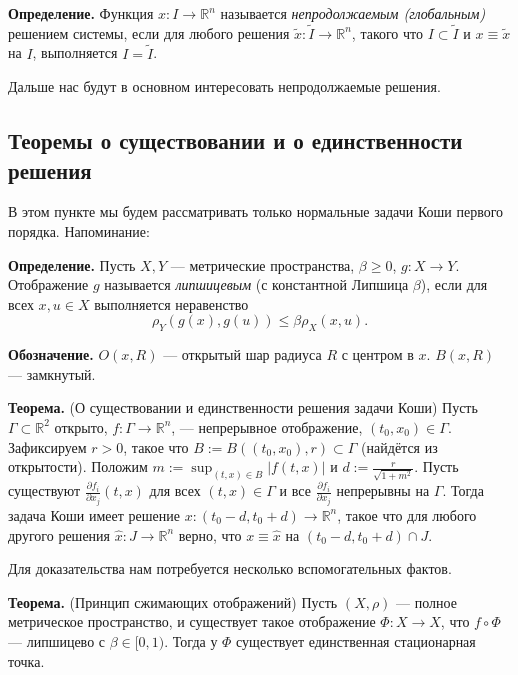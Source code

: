 \textbf{Определение.} Функция $x: I \to \mathbb R^n$ называется \textit{непродолжаемым (глобальным)} решением системы, если для любого решения $\tilde{x}: \tilde{I} \to \mathbb R^n$, такого что $I \subset \tilde{I}$ и $x \equiv \tilde{x}$ на $I$, выполняется $I = \tilde{I}$.

Дальше нас будут в основном интересовать непродолжаемые решения.

\subsection{Теоремы о существовании и о единственности решения}
В этом пункте мы будем рассматривать только нормальные задачи Коши первого порядка. Напоминание:

\textbf{Определение.} Пусть $X, Y$ --- метрические пространства, $\beta \ge 0$, $g: X \to Y$. Отображение $g$ называется \textit{липшицевым} (с константной Липшица $\beta$), если для всех $x, u \in X$ выполняется неравенство
\[
    \rho_Y(g(x), g(u)) \le \beta \rho_X(x, u).
\]

\textbf{Обозначение.} $O(x, R)$ --- открытый шар радиуса $R$ с центром в $x$. $B(x, R)$ --- замкнутый.

\textbf{Теорема.} (О существовании и единственности решения задачи Коши)
Пусть $\Gamma \subset \mathbb R^2$ открыто, $f: \Gamma \to \mathbb R^n$, --- непрерывное отображение, $(t_0, x_0) \in \Gamma$.
Зафиксируем $r > 0$, такое что $B := B((t_0, x_0), r) \subset \Gamma$ (найдётся из открытости).
Положим $m := \sup_{(t, x) \in B} |f(t, x)|$ и $d := \frac{r}{\sqrt {1 + m^2}}$.
Пусть существуют $\frac{\partial f_i}{\partial x_j}(t, x)$ для всех $(t, x) \in \Gamma$ и все $\frac{\partial f_i}{\partial x_j}$ непрерывны на $\Gamma$.
Тогда задача Коши имеет решение $x: (t_0 - d, t_0 + d) \to \mathbb R^n$, такое что для любого другого решения $\widehat{x}: J \to \mathbb R^n$ верно, что $x \equiv \widehat{x}$ на $(t_0 - d, t_0 + d) \cap J$.

Для доказательства нам потребуется несколько вспомогательных фактов.

\textbf{Теорема.} (Принцип сжимающих отображений) Пусть $(X, \rho)$ --- полное метрическое пространство, и существует такое отображение $\Phi: X \to X$, что $f \circ \Phi$ --- липшицево с $\beta \in [0, 1)$.
Тогда у $\Phi$ существует единственная стационарная точка.

